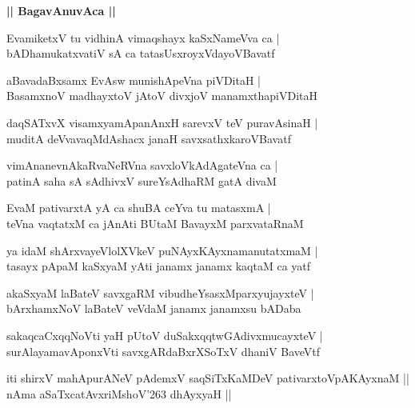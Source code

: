 \documentclass[twoside,12pt,openright]{book}
\def\S{\char'263}
\newcounter{shloka}[chapter]
\def\uvaca#1{\centerline{{\large\textbf{#1}}}}
\begin{document}
\uvaca{|| BagavAnuvAca ||}

\begin{shloka}%
EvamiketxV tu vidhinA vimaqshayx kaSxNameVva ca |\\
bADhamukatxvatiV sA ca tatasUsxroyxVdayoVBavatf
\end{shloka}

\begin{shloka}%
aBavadaBxsamx EvAsw munishApeVna piVDitaH |\\
BasamxnoV madhayxtoV jAtoV divxjoV manamxthapiVDitaH 
\end{shloka}

\begin{shloka}%
daqSATxvX visamxyamApanAnxH sarevxV teV puravAsinaH |\\
muditA deVvavaqMdAshacx janaH savxsathxkaroVBavatf
\end{shloka}

\begin{shloka}%
vimAnanevnAkaRvaNeRVna savxloVkAdAgateVna ca |\\
patinA saha sA sAdhivxV sureYsAdhaRM gatA divaM 
\end{shloka}

\begin{shloka}%
EvaM pativarxtA yA ca shuBA ceYva tu matasxmA |\\
teVna vaqtatxM ca jAnAti BUtaM BavayxM parxvataRnaM 
\end{shloka}

\begin{shloka}%
ya idaM shArxvayeVlolXVkeV puNAyxKAyxnamanutatxmaM |\\
tasayx pApaM kaSxyaM yAti janamx janamx kaqtaM ca yatf
\end{shloka}

\begin{shloka}%
akaSxyaM laBateV savxgaRM vibudheYsasxMparxyujayxteV |\\
bArxhamxNoV laBateV veVdaM janamx janamxsu bADaba
\end{shloka}

\begin{shloka}%
sakaqcaCxqqNoVti yaH pUtoV duSakxqqtwGAdivxmucayxteV |\\
surAlayamavAponxVti savxgARdaBxrXSoTxV dhaniV BaveVtf
\end{shloka}

\begin{center}
iti shirxV mahApurANeV pAdemxV saqSiTxKaMDeV pativarxtoVpAKAyxnaM  || nAma aSaTxcatAvxriMshoV\S 
dhAyxyaH ||
\end{center}
\end{document}
